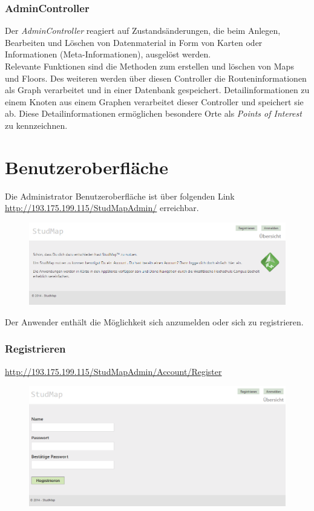 \subsubsection*{AdminController}
Der \textit{AdminController} reagiert auf Zustandsänderungen, die beim Anlegen, Bearbeiten und Löschen von Datenmaterial in Form von Karten oder Informationen (Meta-Informationen), ausgelöst werden.\\
Relevante Funktionen sind die Methoden zum erstellen und löschen von Maps und Floors.
Des weiteren werden über diesen Controller die Routeninformationen als Graph verarbeitet und in einer Datenbank gespeichert. Detailinformationen zu einem Knoten aus einem Graphen verarbeitet dieser Controller und speichert sie ab. Diese Detailinformationen ermöglichen besondere Orte als \textit{Points of Interest} zu kennzeichnen.

\section{Benutzeroberfläche}
Die Administrator Benutzeroberfläche ist über folgenden Link \\
\href{URL}{http://193.175.199.115/StudMapAdmin/} erreichbar.
\begin{figure}[H]
\centering
\includegraphics[width=\linewidth]{../Bilder/Admin/AdminHome}
\label{fig:AdminHome}
\end{figure}
Der Anwender enthält die Möglichkeit sich anzumelden oder sich zu registrieren.
\subsubsection*{Registrieren}
\href{URL}{http://193.175.199.115/StudMapAdmin/Account/Register}
\begin{figure}[H]
\centering
\includegraphics[width=\linewidth]{../Bilder/Admin/AdminRegistrierung}
\label{fig:AdminRegistrierung}
\end{figure}

